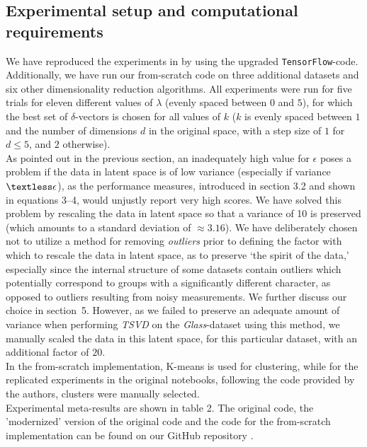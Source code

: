 \subsection{Experimental setup and computational requirements}
We have reproduced the experiments in \cite{plumb2020explaining} by using the upgraded \texttt{TensorFlow}-code. Additionally, we have run our from-scratch code on three additional datasets and six other dimensionality reduction algorithms. All experiments were run for five trials for eleven different values of $\lambda$ (evenly spaced between $0$ and $5$), for which the best set of $\delta$-vectors is chosen for all values of $k$ ($k$ is evenly spaced between $1$ and the number of dimensions $d$ in the original space, with a step size of $1$ for $d \leq 5$, and $2$ otherwise).\\
    
As pointed out in the previous section, an inadequately high value for $\epsilon$ poses a problem if the data in latent space is of low variance (especially if variance $\textless \epsilon$), as the performance measures, introduced in section 3.2 and shown in equations 3--4, would unjustly report very high scores. We have solved this problem by rescaling the data in latent space so that a variance of 10 is preserved (which amounts to a standard deviation of $\approx 3.16$). We have deliberately chosen not to utilize a method for removing \textit{outliers} prior to defining the factor with which to rescale the data in latent space, as to preserve `the spirit of the data,' especially since the internal structure of some datasets contain outliers which potentially correspond to groups with a significantly different character, as opposed to outliers resulting from noisy measurements. We further discuss our choice in section~5. However, as we failed to preserve an adequate amount of variance when performing \textit{TSVD} on the \textit{Glass}-dataset using this method, we manually scaled the data in this latent space, for this particular dataset, with an additional factor of $20$.\\

In the from-scratch implementation, K-means is used for clustering, while for the replicated experiments in the original notebooks, following the code provided by the authors, clusters were manually selected.\\

Experimental meta-results are shown in table 2. The original code, the 'modernized' version of the original code and the code for the from-scratch implementation can be found on our GitHub repository \cite{damiaan_j_w_reijnaers_2021_4686025}.

